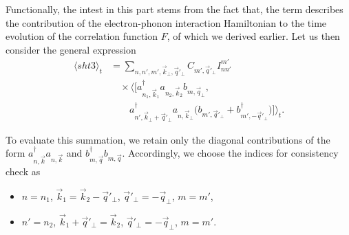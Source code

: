 \documentclass[%
 reprint,
 amsmath,amssymb,
 aps,
]{revtex4-2}
\begin{document}
Functionally, the intest in this part stems from the fact that, the term describes the contribution of the electron-phonon interaction Hamiltonian to the time evolution of the correlation function $F$, of which we derived earlier. Let us then consider the general expression
\begin{equation}
\begin{split}
\langle sht3 \rangle_t
&=
\sum_{n,n',m',\vec{k}_{\perp},\vec{q}'_{\perp}}
C_{m',\vec{q}'_{\perp}}
I_{nn'}^{m'}
\\
&\quad\times
\Big\langle
\Big[
a_{n_1,\vec{k}_1}^{\dagger}
a_{n_2,\vec{k}_2}
b_{m,\vec{q}_{\perp}},
\\
&\qquad
a_{n',\vec{k}_{\perp}+\vec{q}'_{\perp}}^{\dagger}
a_{n,\vec{k}_{\perp}}
\Big(
b_{m',\vec{q}'_{\perp}}
+
b_{m',-\vec{q}'_{\perp}}^{\dagger}
\Big)
\Big]
\Big\rangle_t.
\end{split}
\end{equation}

To evaluate this summation, we retain only the diagonal contributions of the form
$a_{n,\vec{k}}^{\dagger} a_{n,\vec{k}}$
and
$b_{m,\vec{q}}^{\dagger} b_{m,\vec{q}}$.
Accordingly, we choose the indices for consistency check as
\begin{itemize}
\item $n = n_1$, $\vec{k}_1 = \vec{k}_2 - \vec{q}'_{\perp}$, $\vec{q}'_{\perp} = -\vec{q}_{\perp}$, $m = m'$,
\item $n' = n_2$, $\vec{k}_1 + \vec{q}'_{\perp} = \vec{k}_2$, $\vec{q}'_{\perp} = -\vec{q}_{\perp}$, $m = m'$.
\end{itemize}
\end{document}
